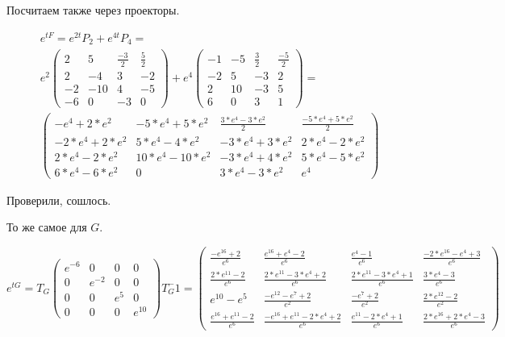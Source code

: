 \documentclass[12pt, a4paper]{article}
\begin{document}
    Посчитаем также через проекторы.

    \begin{multline}
        e^{t F} = e^{2t} P_2 + e^{4t} P_4 = \\
        e^2 \left(\begin{matrix}
            2 & 5 & \frac{-3}{2} & \frac{5}{2} \\
            2 & -4 & 3 & -2 \\
            -2 & -10 & 4 & -5 \\
            -6 & 0 & -3 & 0
        \end{matrix}\right) + e^4 \left(\begin{matrix}
            -1 & -5 & \frac{3}{2} & \frac{-5}{2} \\
            -2 & 5 & -3 & 2 \\
            2 & 10 & -3 & 5 \\
            6 & 0 & 3 & 1
        \end{matrix}\right) = \\
        \left(\begin{matrix}
            -e^4+2*e^2 & -5*e^4+5*e^2 & \frac{3*e^4-3*e^2}{2} & \frac{-5*e^4+5*e^2}{2} \\
            -2*e^4+2*e^2 & 5*e^4-4*e^2 & -3*e^4+3*e^2 & 2*e^4-2*e^2 \\
            2*e^4-2*e^2 & 10*e^4-10*e^2 & -3*e^4+4*e^2 & 5*e^4-5*e^2 \\
            6*e^4-6*e^2 & 0 & 3*e^4-3*e^2 & e^4
        \end{matrix}\right)
    \end{multline}

    Проверили, сошлось.

    То же самое для $G$.

    \begin{equation}
        e^{t G} = T_G \left(\begin{matrix}
            e^{-6} & 0 & 0 & 0 \\
            0 & e^{-2} & 0 & 0 \\
            0 & 0 & e^{5} & 0 \\
            0 & 0 & 0 & e^{10}
        \end{matrix}\right) T_G^-1 = \left(\begin{matrix}
            \frac{-e^16+2}{e^6} & \frac{e^16+e^4-2}{e^6} & \frac{e^4-1}{e^6} & \frac{-2*e^16-e^4+3}{e^6} \\
            \frac{2*e^11-2}{e^6} & \frac{2*e^11-3*e^4+2}{e^6} & \frac{2*e^11-3*e^4+1}{e^6} & \frac{3*e^4-3}{e^6} \\
            e^10-e^5 & \frac{-e^12-e^7+2}{e^2} & \frac{-e^7+2}{e^2} & \frac{2*e^12-2}{e^2} \\
            \frac{e^16+e^11-2}{e^6} & \frac{-e^16+e^11-2*e^4+2}{e^6} & \frac{e^11-2*e^4+1}{e^6} & \frac{2*e^16+2*e^4-3}{e^6}
        \end{matrix}\right)

    \end{equation}
\end{document}
